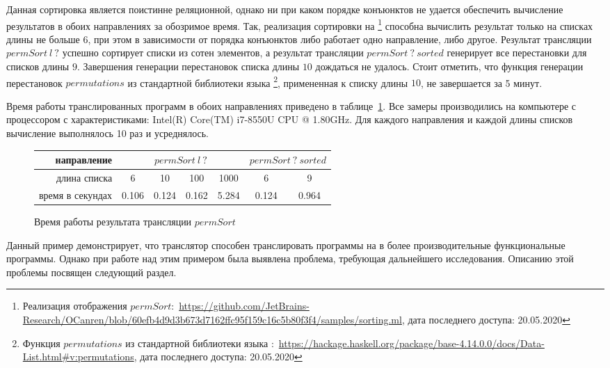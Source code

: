 Данная сортировка является поистинне реляционной, однако ни при каком порядке конъюнктов не удается обеспечить вычисление результатов в обоих направлениях за обозримое время.
Так, реализация сортировки на \ocanren{}\footnote{Реализация отображения $permSort$:~\url{https://github.com/JetBrains-Research/OCanren/blob/60efb4d9d3b673d7162ffc95f159c16c5b80f3f4/samples/sorting.ml}, дата последнего доступа: 20.05.2020} способна вычислить результат только на списках длины не больше $6$, при этом в зависимости от порядка конъюнктов либо работает одно направление, либо другое. 
Результат трансляции $permSort \ l \ ?$ успешно сортирует списки из сотен элементов, а результат трансляции $permSort \ ? \ sorted$ генерирует все перестановки для списков длины $9$.
Завершения генерации перестановок списка длины $10$ дождаться не удалось. 
Стоит отметить, что функция генерации перестановок $permutations$ из стандартной библиотеки языка \haskell{}\footnote{Функция $permutations$ из стандартной библиотеки языка \haskell{}:~\url{https://hackage.haskell.org/package/base-4.14.0.0/docs/Data-List.html\#v:permutations}, дата последнего доступа: 20.05.2020}, примененная к списку длины $10$, не завершается за 5 минут.

Время работы транслированных программ в обоих направлениях приведено в таблице~\ref{tab:sort}. 
Все замеры производились на компьютере с процессором с характеристиками: Intel(R) Core(TM) i7-8550U CPU @ 1.80GHz.
Для каждого направления и каждой длины списков вычисление выполнялось 10 раз и усреднялось.

\begin{figure}[h!]
\begin{center}
\begin{tabular}{|r|c|c|c|c||c|c|}
      \hline
      направление & \multicolumn{4}{|c||}{$permSort \ l \ ?$} & \multicolumn{2}{|c|}{$permSort \ ? \ sorted$}  \tabularnewline
      \hline 
длина списка & 6 & 10 & 100 & 1000 & 6 & 9 \\ \hline
время в секундах & 0.106 & 0.124 & 0.162 & 5.284 & 0.124 & 0.964 \\
      \hline
\end{tabular}
\caption{Время работы результата трансляции $permSort$}
\label{tab:sort}
\end{center}
\end{figure}

Данный пример демонстрирует, что транслятор способен транслировать программы на \miniKanren{} в более производительные функциональные программы. 
Однако при работе над этим примером была выявлена проблема, требующая дальнейшего исследования.
Описанию этой проблемы посвящен следующий раздел.


